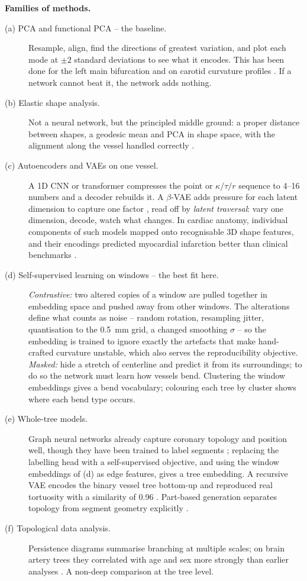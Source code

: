 \textbf{Families of methods.}
\begin{description}
  \item[(a) PCA and functional PCA -- the baseline.] Resample, align, find the directions of
    greatest variation, and plot each mode at $\pm 2$ standard deviations to see what it encodes.
    This has been done for the left main bifurcation \cite{medranogracia2017bifurcation} and on
    carotid curvature profiles \cite{sangalli2009aneurisk}. If a network cannot beat it, the
    network adds nothing.
  \item[(b) Elastic shape analysis.] Not a neural network, but the principled middle ground: a
    proper distance between shapes, a geodesic mean and PCA in shape space, with the alignment
    along the vessel handled correctly \cite{wang2024elastictrees}.
  \item[(c) Autoencoders and VAEs on one vessel.] A 1D CNN or transformer compresses the point or
    $\kappa/\tau/r$ sequence to 4--16 numbers and a decoder rebuilds it. A $\beta$-VAE adds
    pressure for each latent dimension to capture one factor \cite{higgins2017betavae}, read off by
    \emph{latent traversal}: vary one dimension, decode, watch what changes. In cardiac anatomy,
    individual components of such models mapped onto recognisable 3D shape features, and their
    encodings predicted myocardial infarction better than clinical benchmarks
    \cite{beetz2022meshvae, beetz2025pointvae}.
  \item[(d) Self-supervised learning on windows -- the best fit here.] \emph{Contrastive:} two
    altered copies of a window are pulled together in embedding space and pushed away from other
    windows. The alterations define what counts as noise -- random rotation, resampling jitter,
    quantisation to the 0.5~mm grid, a changed smoothing $\sigma$ -- so the embedding is trained
    to ignore exactly the artefacts that make hand-crafted curvature unstable, which also serves
    the reproducibility objective. \emph{Masked:} hide a stretch of centerline and predict it from
    its surroundings; to do so the network must learn how vessels bend. Clustering the window
    embeddings gives a bend vocabulary; colouring each tree by cluster shows where each bend type
    occurs.
  \item[(e) Whole-tree models.] Graph neural networks already capture coronary topology and
    position well, though they have been trained to label segments
    \cite{hampe2024gnn, zhao2023eagmn}; replacing the labelling head with a self-supervised
    objective, and using the window embeddings of (d) as edge features, gives a tree embedding.
    A recursive VAE encodes the binary vessel tree bottom-up and reproduced real tortuosity with a
    similarity of 0.96 \cite{feldman2023vesselvae}. Part-based generation separates topology from
    segment geometry explicitly \cite{chen2025partvessel}.
  \item[(f) Topological data analysis.] Persistence diagrams summarise branching at multiple
    scales; on brain artery trees they correlated with age and sex more strongly than earlier
    analyses \cite{bendich2016persistent}. A non-deep comparison at the tree level.
\end{description}

